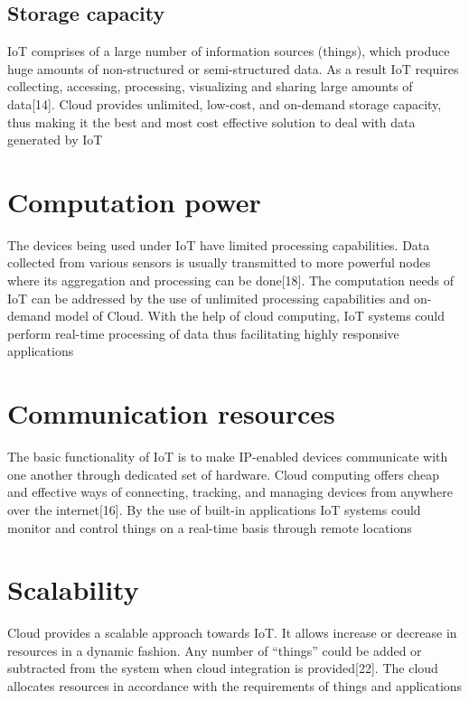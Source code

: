 \documentclass[conference]{IEEEtran}
\begin{document}
\subsection{Storage capacity}
IoT comprises of a large number of information sources (things), which produce huge amounts of non-structured or semi-structured data. As a result IoT requires collecting, accessing, processing, visualizing and sharing large amounts of data[14]. Cloud provides unlimited, low-cost, and on-demand storage capacity, thus making it the best and most cost effective solution to deal with data generated by IoT


\section*{Computation power}

The devices being used under IoT have limited processing capabilities. Data collected from various sensors is usually transmitted to more powerful nodes where its aggregation and processing can be done[18]. The computation needs of IoT can be addressed by the use of unlimited processing capabilities and on-demand model of Cloud. With the help of cloud computing, IoT systems could perform real-time processing of data thus facilitating highly responsive applications

\section*{Communication resources}

The basic functionality of IoT is to make IP-enabled devices communicate with one another through dedicated set of hardware. Cloud computing offers cheap and effective ways of connecting, tracking, and managing devices from anywhere over the internet[16]. By the use of built-in applications IoT systems could monitor and control things on a real-time basis through remote locations
\section*{Scalability}
Cloud provides a scalable approach towards IoT. It allows increase or decrease in resources in a dynamic fashion. Any number of “things” could be added or subtracted from the system when cloud integration is provided[22]. The cloud allocates resources in accordance with the requirements of things and applications
\end{document}
